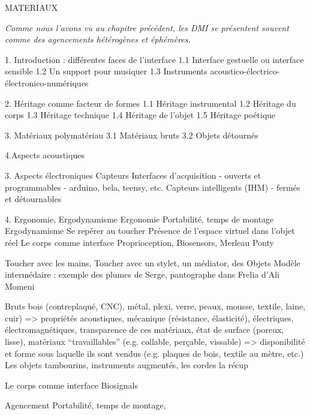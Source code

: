 MATERIAUX

\textit{Comme nous l'avons vu au chapitre précédent, les DMI se présentent souvent comme des agencements hétérogènes et éphémères.}

1. Introduction : différentes faces de l'interface
	1.1 Interface gestuelle ou interface sensible
	1.2 Un support pour musiquer
	1.3 Instruments acoustico-électrico-électronico-numériques
	
2. Héritage comme facteur de formes
	1.1 Héritage instrumental
	1.2 Héritage du corps
	1.3 Héritage technique
	1.4 Héritage de l'objet
	1.5 Héritage poétique

3. Matériaux
	polymatériau
	3.1 Matériaux bruts
	3.2 Objets détournés

4.Aspects acoustiques
	

3. Aspects électroniques
	Capteurs
	Interfaces d'acquisition
		- ouverts et programmables
		- arduino, bela, teensy, etc.
	Capteurs intelligents (IHM)
		- fermés et détournables


4. Ergonomie, Ergodynamisme
	Ergonomie
		Portabilité, temps de montage
	Ergodynamisme
		Se repérer au toucher
			Présence de l'espace virtuel dans l'objet réel
		Le corps comme interface
			Proprioception, Biosensors, Merleau Ponty

	Toucher avec les mains, 	
	Toucher avec un stylet, un médiator, des Objets
	Modèle intermédaire : exemple des plumes de Serge, pantographe dans Frelia d'Ali Momeni



	Bruts
		bois (contreplaqué, CNC), métal, plexi, verre, peaux, mousse, textile, laine, cuir)
		=> propriétés acoustiques, mécanique (résistance, élasticité), électriques, électromagnétiques, transparence de ces matériaux, état de surface (poreux, lisse), matériaux ``travaillables'' (e.g. collable, perçable, vissable)
		=> disponibilité et forme sous laquelle ils sont vendus (e.g. plaques de bois, textile au mètre, etc.)
	Les objets
		tambourins, instruments augmentés, les cordes
		la récup

	Le corps comme interface
		Biosignals

	Agencement
		Portabilité, temps de montage, 